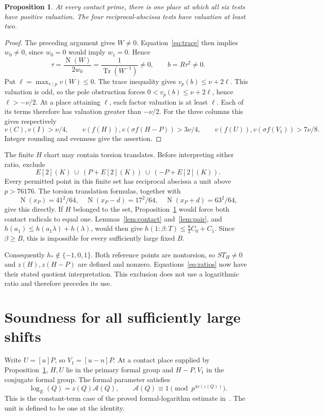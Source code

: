 \documentclass[11pt,a4paper]{article}
\newtheorem{proposition}[theorem]{Proposition}
\DeclareMathOperator{\Tr}{Tr}\DeclareMathOperator{\Nm}{N}
\begin{document}
\begin{proposition}\label{prop:local}
At every contact prime, there is one place at which all six tests have
positive valuation. The four reciprocal-abscissa tests have valuation
at least two.
\end{proposition}
\begin{proof}
The preceding argument gives $W\ne0$. Equation~\eqref{eq:trace} then
implies $w_0\ne0$, since $w_0=0$ would imply $w_1=0$. Hence
\[
 \tau=\frac{\Nm(W)}{2w_0}=\frac1{\Tr(W^{-1})}\ne0,
 \qquad b=R\tau^2\ne0.
\]
Put $\ell=\max_{v\mid p}v(W)\le0$. The trace inequality gives
$v_p(b)\le\nu+2\ell$. This valuation is odd, so the pole obstruction
forces $0<v_p(b)\le\nu+2\ell$, hence $\ell>-\nu/2$.
At a place attaining $\ell$, each factor valuation is at least $\ell$.
Each of its terms therefore has valuation greater than $-\nu/2$.
For the three columns this gives respectively
\[
 v(C),v(I)>\nu/4,\qquad
 v(f(H)),v(\sigma f(H-P))>3\nu/4,\qquad
 v(f(U)),v(\sigma f(V_1))>7\nu/8.
\]
Integer rounding and evenness give the assertion.
\end{proof}

The finite $H$ chart may contain torsion translates. Before interpreting
either ratio, exclude
\[
                  E[2](K)\ \cup\ (P+E[2](K))\ \cup\ (-P+E[2](K)).
\]
Every permitted point in this finite set has reciprocal abscissa a unit
above $p>76176$. The torsion translation formulas, together with
\[
 \Nm(x_P)=41^2/64,\quad
 \Nm(x_P-d)=17^2/64,\quad \Nm(x_P+d)=63^2/64,
\]
give this directly. If $H$ belonged to the set, Proposition~\ref{prop:local}
would force both contact radicals to equal one. Lemmas~\ref{lem:contact}
and~\ref{lem:pair}, and $h(a_1)\le h(a_1\lambda)+h(\lambda)$, would
then give $h(1:\beta:T)\le\frac83C_0+C_1$. Since $\beta\ge B$, this is
impossible for every sufficiently large fixed $B$.

Consequently $h_*\notin\{-1,0,1\}$. Both reference points are
nontorsion, so $S T_H\ne0$ and $z(H),z(H-P)$ are defined and nonzero.
Equations~\eqref{eq:ratios} now have their stated quotient interpretation.
This exclusion does not use a logarithmic ratio and therefore precedes
its use.

\section{Soundness for all sufficiently large shifts}

Write $U=[u]P$, so $V_1=[u-n]P$. At a contact place supplied by
Proposition~\ref{prop:local}, $H,U$ lie in the primary formal group
and $H-P,V_1$ in the conjugate formal group. The formal parameter satisfies
\begin{equation}\label{eq:log}
 \log_E(Q)=z(Q)\mathcal A(Q),\qquad
 \mathcal A(Q)\equiv1\pmod{p^{4v(z(Q))}}.
\end{equation}
This is the constant-term case of the proved formal-logarithm estimate
in~\cite{Logs}. The unit is defined to be one at the identity.
\end{document}
